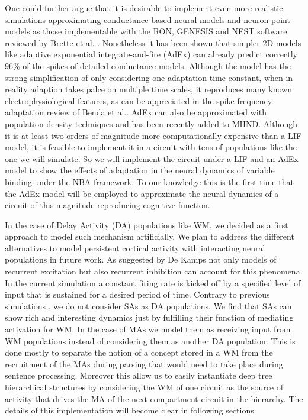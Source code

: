 \documentclass[10pt]{article}
\begin{document}
One could further argue that it is desirable to implement even more
realistic simulations approximating conductance based neural models and
neuron point models as those implementable with the RON, GENESIS and
NEST software reviewed by Brette et al. \cite{brette2007simulation}. Nonetheless
it has been shown that simpler 2D models like adaptive exponential
integrate-and-fire (AdEx) can already predict correctly 96\% of the
spikes of detailed conductance models\cite{brette2005adaptive}. Although the
model has the strong simplification of only considering one adaptation
time constant, when in reality adaption takes palce on multiple time
scales, it reproduces many known electrophysiological features, as can
be appreciated in the spike-frequency adaptation review of Benda et
al.\cite{Benda_2003,Benda_2014}. AdEx can also be approximated with population
density techniques and has been recently added to MIIND. Although it is
at least two orders of magnitude more computationally expensive than a
LIF model, it is feasible to implement it in a circuit with tens of
populations like the one we will simulate. So we will implement the
circuit under a LIF and an AdEx model to show the effects of adaptation
in the neural dynamics of variable binding under the NBA framework. To
our knowledge this is the first time that the AdEx model will be
employed to approximate the neural dynamics of a circuit of this
magnitude reproducing cognitive function.

In the case of Delay Activity (DA) populations like WM, we decided as a
first approach to model such mechanism artificially. We plan to address
the different alternatives to model persistent cortical activity with
interacting neural populations in future work. As suggested by De
Kamps\cite{de_Kamps_2005} not only models of recurrent excitation but
also recurrent inhibition can account for this phenomena. In the current
simulation a constant firing rate is kicked off by a specified level of
input that is sustained for a desired period of time. Contrary to
previous simulations \cite{velde2015ambiguity}, we do not consider SAs as DA
populations. We find that SAs can show rich and interesting dynamics
just by fulfilling their function of mediating activation for WM. In the
case of MAs we model them as receiving input from WM populations instead
of considering them as another DA population. This is done mostly to
separate the notion of a concept stored in a WM from the recruitment of
the MAs during parsing that would need to take place during sentence
processing. Moreover this allow us to easily instantiate deep tree
hierarchical structures by considering the WM of one circuit as the
source of activity that drives the MA of the next compartment circuit in
the hierarchy. The details of this implementation will become clear in
following sections.
\end{document}
